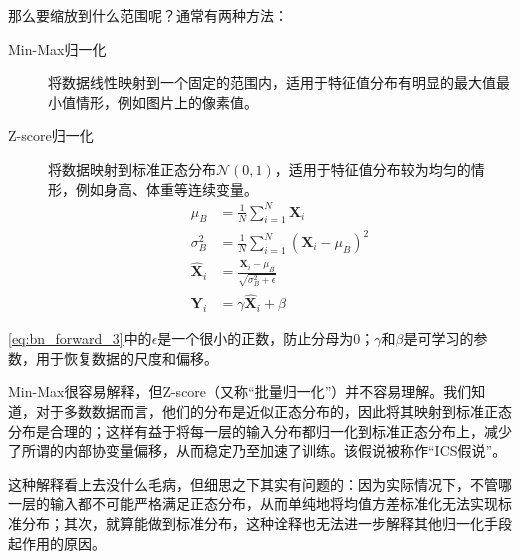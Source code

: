 那么要缩放到什么范围呢？通常有两种方法：
\begin{description}
    \item[Min-Max归一化] 将数据线性映射到一个固定的范围内，适用于特征值分布有明显的最大值最小值情形，例如图片上的像素值。
    \item[Z-score归一化] 将数据映射到标准正态分布$\mathcal{N}(0, 1)$，适用于特征值分布较为均匀的情形，例如身高、体重等连续变量。
        \begin{align}
            \mu_B &= \frac{1}{N} \sum_{i=1}^{N} \mathbf{X}_i \\
            \sigma_B^2 &= \frac{1}{N} \sum_{i=1}^{N} (\mathbf{X}_i - \mu_B)^2 \\
            \hat{\mathbf{X}}_i &= \frac{\mathbf{X}_i - \mu_B}{\sqrt{\sigma_B^2 + \epsilon}} \label{eq:bn_forward_3}\\
            \mathbf{Y}_i &= \gamma \hat{\mathbf{X}}_i + \beta
        \end{align}
\end{description}
\eqref{eq:bn_forward_3}中的$\epsilon$是一个很小的正数，防止分母为0；$\gamma$和$\beta$是可学习的参数，用于恢复数据的尺度和偏移。

%     

Min-Max很容易解释，但Z-score（又称“批量归一化”）并不容易理解。我们知道，对于多数数据而言，他们的分布是近似正态分布的，因此将其映射到标准正态分布是合理的；这样有益于将每一层的输入分布都归一化到标准正态分布上，减少了所谓的内部协变量偏移，从而稳定乃至加速了训练\cite{ioffe2015batchnormalizationacceleratingdeep}。该假说被称作“ICS假说”。

这种解释看上去没什么毛病，但细思之下其实有问题的：因为实际情况下，不管哪一层的输入都不可能严格满足正态分布，从而单纯地将均值方差标准化无法实现标准分布；其次，就算能做到标准分布，这种诠释也无法进一步解释其他归一化手段起作用的原因。\cite{kexuefm-6992}

